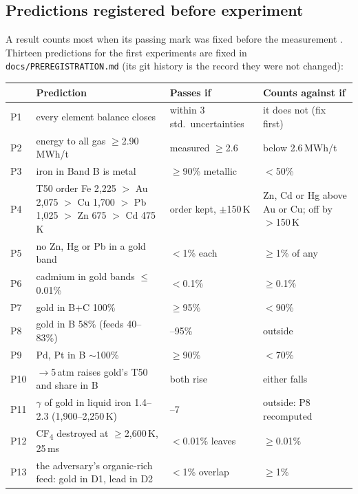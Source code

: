 \documentclass[11pt,a4paper]{article}
\begin{document}
\subsection{Predictions registered before experiment}
A result counts most when its passing mark was fixed before the measurement \citep{nosek2018}. Thirteen predictions for the first experiments are fixed in \texttt{docs/PREREGISTRATION.md} (its git history is the record they were not changed):
\begin{center}
\small
\begin{tabular}{@{}l>{\raggedright\arraybackslash}p{6.2cm}>{\raggedright\arraybackslash}p{3.1cm}>{\raggedright\arraybackslash}p{4.2cm}@{}}
\toprule
& \textbf{Prediction} & \textbf{Passes if} & \textbf{Counts against if} \\
\midrule
P1 & every element balance closes & within 3 std.\ uncertainties & it does not (fix first) \\
P2 & energy to all gas $\ge$2.90\,MWh/t & measured $\ge$2.6 & below 2.6\,MWh/t \\
P3 & iron in Band B is metal & $\ge$90\% metallic & $<$50\% \\
P4 & T50 order Fe 2,225 $>$ Au 2,075 $>$ Cu 1,700 $>$ Pb 1,025 $>$ Zn 675 $>$ Cd 475\,K & order kept, $\pm$150\,K & Zn, Cd or Hg above Au or Cu; off by $>$150\,K \\
P5 & no Zn, Hg or Pb in a gold band & $<$1\% each & $\ge$1\% of any \\
P6 & cadmium in gold bands $\le$0.01\% & $<$0.1\% & $\ge$0.1\% \\
P7 & gold in B+C 100\% & $\ge$95\% & $<$90\% \\
P8 & gold in B 58\% (feeds 40--83\%) & 20--95\% & outside \\
P9 & Pd, Pt in B $\sim$100\% & $\ge$90\% & $<$70\% \\
P10 & 1$\to$5\,atm raises gold's T50 and share in B & both rise & either falls \\
P11 & $\gamma$ of gold in liquid iron 1.4--2.3 (1,900--2,250\,K) & 0.5--7 & outside: P8 recomputed \\
P12 & CF\textsubscript{4} destroyed at $\ge$2,600\,K, 25\,ms & $<$0.01\% leaves & $\ge$0.01\% \\
P13 & the adversary's organic-rich feed: gold in D1, lead in D2 & $<$1\% overlap & $\ge$1\% \\
\bottomrule
\end{tabular}
\end{center}
\end{document}
